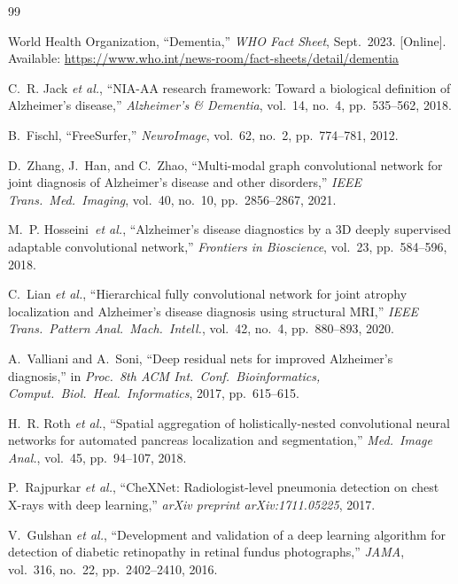 \documentclass[conference]{IEEEtran}
\begin{document}
\balance

\begin{thebibliography}{99}

World Health Organization,
``Dementia,''
\textit{WHO Fact Sheet}, Sept.\ 2023.
[Online]. Available: \url{https://www.who.int/news-room/fact-sheets/detail/dementia}

C.~R. Jack \textit{et al.},
``NIA-AA research framework: Toward a biological definition of
Alzheimer's disease,''
\textit{Alzheimer's \& Dementia}, vol.~14, no.~4, pp.~535--562, 2018.

B.~Fischl,
``FreeSurfer,''
\textit{NeuroImage}, vol.~62, no.~2, pp.~774--781, 2012.

D.~Zhang, J.~Han, and C.~Zhao,
``Multi-modal graph convolutional network for joint diagnosis of
Alzheimer's disease and other disorders,''
\textit{IEEE Trans.\ Med.\ Imaging}, vol.~40, no.~10, pp.~2856--2867, 2021.

M.~P. Hosseini~\textit{et al.},
``Alzheimer's disease diagnostics by a 3D deeply supervised adaptable
convolutional network,''
\textit{Frontiers in Bioscience}, vol.~23, pp.~584--596, 2018.

C.~Lian \textit{et al.},
``Hierarchical fully convolutional network for joint atrophy
localization and Alzheimer's disease diagnosis using structural MRI,''
\textit{IEEE Trans.\ Pattern Anal.\ Mach.\ Intell.}, vol.~42, no.~4,
pp.~880--893, 2020.

A.~Valliani and A.~Soni,
``Deep residual nets for improved Alzheimer's diagnosis,''
in \textit{Proc.\ 8th ACM Int.\ Conf.\ Bioinformatics, Comput.\ Biol.\
Heal.\ Informatics}, 2017, pp.~615--615.

H.~R. Roth \textit{et al.},
``Spatial aggregation of holistically-nested convolutional neural
networks for automated pancreas localization and segmentation,''
\textit{Med.\ Image Anal.}, vol.~45, pp.~94--107, 2018.

P.~Rajpurkar \textit{et al.},
``CheXNet: Radiologist-level pneumonia detection on chest X-rays with
deep learning,''
\textit{arXiv preprint arXiv:1711.05225}, 2017.

V.~Gulshan \textit{et al.},
``Development and validation of a deep learning algorithm for detection
of diabetic retinopathy in retinal fundus photographs,''
\textit{JAMA}, vol.~316, no.~22, pp.~2402--2410, 2016.


\end{thebibliography}
\end{document}

